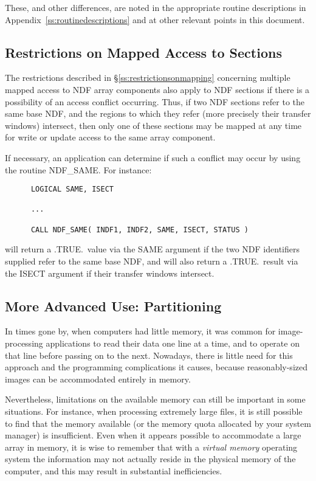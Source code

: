 \documentclass[twoside,11pt]{article}
\newcommand{\htmlref}[2]{#1}
\newcommand{\xlabel}[1]{}
\newcommand{\st}[1]{{\em{#1}}}
\begin{document}
These, and other differences, are noted in the appropriate routine
descriptions in Appendix~\ref{ss:routinedescriptions} and at other relevant
points in this document. 

\subsection{\xlabel{restrictions_on_mapped_access_to_sections}Restrictions on Mapped Access to Sections}

The restrictions described in \S\ref{ss:restrictionsonmapping} concerning
multiple mapped access to NDF array components also apply to NDF sections if
there is a possibility of an access conflict occurring. 
Thus, if two NDF sections refer to the same base NDF, and the regions to
which they refer (more precisely their transfer windows) intersect, then only
one of these sections may be mapped at any time for write or update access
to the same array component.

If necessary, an application can determine if such a conflict may occur by
using the routine \htmlref{NDF\_SAME}{NDF_SAME}. 
For instance:

\small
\begin{verbatim}
      LOGICAL SAME, ISECT

      ...

      CALL NDF_SAME( INDF1, INDF2, SAME, ISECT, STATUS )
\end{verbatim}
\normalsize

will return a .TRUE.\ value via the SAME argument if the two NDF identifiers 
supplied refer to the same base NDF, and will also return a .TRUE.\ result 
via the ISECT argument if their transfer windows intersect.

\subsection{\xlabel{more_advanced_use_partitioning}\label{ss:partitioning}More Advanced Use: Partitioning}

In times gone by, when computers had little memory, it was common for
image-processing applications to read their data one line at a time, and
to operate on that line before passing on to the next. Nowadays, there
is little need for this approach and the programming complications it
causes, because reasonably-sized images can be accommodated entirely in
memory.

Nevertheless, limitations on the available memory can still be important in some
situations. For instance, when processing extremely large files, it is still
possible to find that the memory available (or the memory quota allocated by
your system manager) is insufficient. Even when it appears possible to
accommodate a large array in memory, it is wise to remember that with
a \st{virtual memory\/} operating system the information may not
actually reside in 
the physical memory of the computer, and this may result in substantial
inefficiencies.
\end{document}
